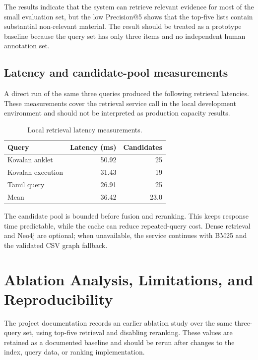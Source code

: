\documentclass[11pt,a4paper]{article}
\begin{document}
The results indicate that the system can retrieve relevant evidence for most of the small evaluation set, but the low Precision@5 shows that the top-five lists contain substantial non-relevant material. The result should be treated as a prototype baseline because the query set has only three items and no independent human annotation set.

\subsection{Latency and candidate-pool measurements}

A direct run of the same three queries produced the following retrieval latencies. These measurements cover the retrieval service call in the local development environment and should not be interpreted as production capacity results.

\begin{table}[ht]
\centering
\caption{Local retrieval latency measurements.}
\label{tab:latency}
\small
\begin{tabular}{lrr}
\toprule
\textbf{Query} & \textbf{Latency (ms)} & \textbf{Candidates} \\
\midrule
Kovalan anklet & 50.92 & 25 \\
Kovalan execution & 31.43 & 19 \\
Tamil query & 26.91 & 25 \\
\midrule
Mean & 36.42 & 23.0 \\
\bottomrule
\end{tabular}
\end{table}

The candidate pool is bounded before fusion and reranking. This keeps response time predictable, while the cache can reduce repeated-query cost. Dense retrieval and Neo4j are optional; when unavailable, the service continues with BM25 and the validated CSV graph fallback.

\newpage
\section{Ablation Analysis, Limitations, and Reproducibility}

The project documentation records an earlier ablation study over the same three-query set, using top-five retrieval and disabling reranking. These values are retained as a documented baseline and should be rerun after changes to the index, query data, or ranking implementation.
\end{document}
